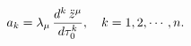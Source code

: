 \begin{equation}
a_{k}=\lambda_{\mu}\, {d^k \, \ddot{z}^{\mu} \over d\tau_{0}^k},
~~~k=1,2,\cdots ,n.
\label{ak}
\end{equation}

